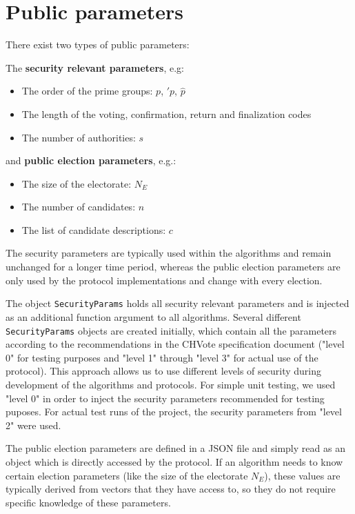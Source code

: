 \documentclass[a4paper,12pt]{report}
\begin{document}
\section{Public parameters}
There exist two types of public parameters:

The \textbf{security relevant parameters}, e.g:

\begin{itemize}
	\item The order of the prime groups: $p$, $\prime{p}$, $\hat{p}$
	\item The length of the voting, confirmation, return and finalization codes
	\item The number of authorities: $s$
\end{itemize}

and \textbf{public election parameters}, e.g.:

\begin{itemize}
	\item The size of the electorate: $N_E$
	\item The number of candidates: $n$
	\item The list of candidate descriptions: $c$
\end{itemize}

The security parameters are typically used within the algorithms and remain unchanged for a longer time period, whereas the public election parameters are only used by the protocol implementations and change with every election.

The object \texttt{SecurityParams} holds all security relevant parameters and is injected as an additional function argument to all algorithms. Several different \texttt{SecurityParams} objects are created initially, which contain all the parameters according to the recommendations in the CHVote specification document ("level 0" for testing purposes and "level 1" through "level 3" for actual use of the protocol). This approach allows us to use different levels of security during development of the algorithms and protocols. For simple unit testing, we used "level 0" in order to inject the security parameters recommended for testing puposes. For actual test runs of the project, the security parameters from "level 2" were used.

The public election parameters are defined in a JSON file and simply read as an object which is directly accessed by the protocol. If an algorithm needs to know certain election parameters (like the size of the electorate $N_E$), these values are typically derived from vectors that they have access to, so they do not require specific knowledge of these parameters.
\end{document}
